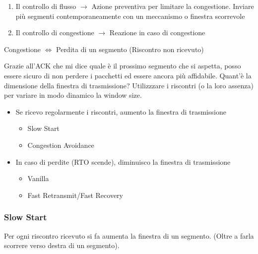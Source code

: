 \documentclass[a4paper]{article}
\begin{document}
\begin{enumerate}
  \item Il controllo di flusso $\rightarrow$ Azione preventiva per limitare la congestione. 
  Inviare più segmenti contemporaneamente con un meccanismo o finestra scorrevole
  \item Il controllo di congestione $\rightarrow$ Reazione in caso di congestione
\end{enumerate}
\begin{center}
  Congestione $\Longleftrightarrow$ Perdita di un segmento (Riscontro non ricevuto)
\end{center}
Grazie all'ACK che mi dice quale è il prossimo segmento che si aspetta, posso essere sicuro di non perdere i pacchetti ed 
essere ancora più affidabile.
Quant'è la dimensione della finestra di trasmissione? Utilizzzare i riscontri (o la loro assenza) per variare in modo dinamico la window size.
\begin{itemize}
  \item Se ricevo regolarmente i riscontri, aumento la finestra di trasmissione
  \begin{itemize}
    \item Slow Start
    \item Congestion Avoidance
  \end{itemize}
  \item In caso di perdite (RTO scende), diminuisco la finestra di trasmissione 
  \begin{itemize}
    \item Vanilla 
    \item Fast Retransmit/Fast Recovery
  \end{itemize}
\end{itemize}

\subsubsection{Slow Start}

Per ogni riscontro ricevuto si fa aumenta la finestra di un segmento. (Oltre a farla scorrere verso destra di un segmento).
\end{document}
